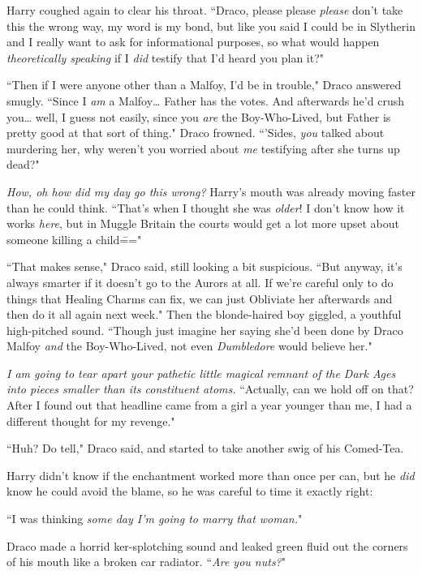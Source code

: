 Harry coughed again to clear his throat. ``Draco, please please \emph{please} don't take this the wrong way, my word is my bond, but like you said I could be in Slytherin and I really want to ask for informational purposes, so what would happen \emph{theoretically speaking} if I \emph{did} testify that I'd heard you plan it?"

``Then if I were anyone other than a Malfoy, I'd be in trouble," Draco answered smugly. ``Since I \emph{am} a Malfoy{\ldots} Father has the votes. And afterwards he'd crush you{\ldots} well, I guess not easily, since you \emph{are} the Boy-Who-Lived, but Father is pretty good at that sort of thing." Draco frowned. ``'Sides, \emph{you} talked about murdering her, why weren't you worried about \emph{me} testifying after she turns up dead?"

\emph{How, oh how did my day go this wrong?} Harry's mouth was already moving faster than he could think. ``That's when I thought she was \emph{older}! I don't know how it works \emph{here}, but in Muggle Britain the courts would get a lot more upset about someone killing a child\==="

``That makes sense," Draco said, still looking a bit suspicious. ``But anyway, it's always smarter if it doesn't go to the Aurors at all. If we're careful only to do things that Healing Charms can fix, we can just Obliviate her afterwards and then do it all again next week." Then the blonde-haired boy giggled, a youthful high-pitched sound. ``Though just imagine her saying she'd been done by Draco Malfoy \emph{and} the Boy-Who-Lived, not even \emph{Dumbledore} would believe her."

\emph{I am going to tear apart your pathetic little magical remnant of the Dark Ages into pieces smaller than its constituent atoms.} ``Actually, can we hold off on that? After I found out that headline came from a girl a year younger than me, I had a different thought for my revenge."

``Huh? Do tell," Draco said, and started to take another swig of his Comed-Tea.

Harry didn't know if the enchantment worked more than once per can, but he \emph{did} know he could avoid the blame, so he was careful to time it exactly right:

``I was thinking \emph{some day I'm going to marry that woman.}"

Draco made a horrid ker-splotching sound and leaked green fluid out the corners of his mouth like a broken car radiator. ``\emph{Are you nuts?}"


